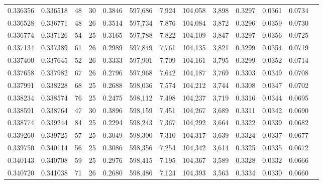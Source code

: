 \begin{tabular}{rrrrrrrrrrrrr}
0.336356 & 0.336518 &  48 &  30 &                                     0.3846 & 597,686 &   7,924 & 104,058 &   3,898 & 0.3297 & 0.0361 & 0.0734 \\
0.336528 & 0.336771 &  48 &  26 &                                     0.3514 & 597,734 &   7,876 & 104,084 &   3,872 & 0.3296 & 0.0359 & 0.0730 \\
0.336774 & 0.337126 &  54 &  25 &                                     0.3165 & 597,788 &   7,822 & 104,109 &   3,847 & 0.3297 & 0.0356 & 0.0725 \\
0.337134 & 0.337389 &  61 &  26 &                                     0.2989 & 597,849 &   7,761 & 104,135 &   3,821 & 0.3299 & 0.0354 & 0.0719 \\
0.337400 & 0.337645 &  52 &  26 &                                     0.3333 & 597,901 &   7,709 & 104,161 &   3,795 & 0.3299 & 0.0352 & 0.0714 \\
0.337658 & 0.337982 &  67 &  26 &                                     0.2796 & 597,968 &   7,642 & 104,187 &   3,769 & 0.3303 & 0.0349 & 0.0708 \\
0.337991 & 0.338228 &  68 &  25 &                                     0.2688 & 598,036 &   7,574 & 104,212 &   3,744 & 0.3308 & 0.0347 & 0.0702 \\
0.338234 & 0.338574 &  76 &  25 &                                     0.2475 & 598,112 &   7,498 & 104,237 &   3,719 & 0.3316 & 0.0344 & 0.0695 \\
0.338591 & 0.338764 &  47 &  30 &                                     0.3896 & 598,159 &   7,451 & 104,267 &   3,689 & 0.3311 & 0.0342 & 0.0690 \\
0.338774 & 0.339244 &  84 &  25 &                                     0.2294 & 598,243 &   7,367 & 104,292 &   3,664 & 0.3322 & 0.0339 & 0.0682 \\
0.339260 & 0.339725 &  57 &  25 &                                     0.3049 & 598,300 &   7,310 & 104,317 &   3,639 & 0.3324 & 0.0337 & 0.0677 \\
0.339750 & 0.340114 &  56 &  25 &                                     0.3086 & 598,356 &   7,254 & 104,342 &   3,614 & 0.3325 & 0.0335 & 0.0672 \\
0.340143 & 0.340708 &  59 &  25 &                                     0.2976 & 598,415 &   7,195 & 104,367 &   3,589 & 0.3328 & 0.0332 & 0.0666 \\
0.340720 & 0.341038 &  71 &  26 &                                     0.2680 & 598,486 &   7,124 & 104,393 &   3,563 & 0.3334 & 0.0330 & 0.0660 \\

\end{tabular}
